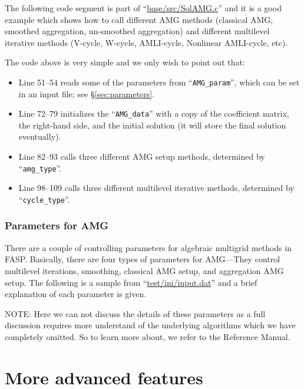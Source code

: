 \documentclass[11pt]{memoir}
\begin{document}
The following code segment is part of ``\url{base/src/SolAMG.c}'' and it is a good example which shows how to call different AMG methods (classical AMG, smoothed aggregation, un-smoothed aggregation) and different multilevel iterative methods (V-cycle, W-cycle, AMLI-cycle, Nonlinear AMLI-cycle, etc).
%

%
The code above is very simple and we only wish to point out that:
%
\begin{itemize}
\item Line 51--54 reads some of the parameters from ``\verb|AMG_param|'', which can be set in an input file; see \S\ref{sec:parameters}.
\item Line 72--79 initializes the ``\verb|AMG_data|'' with a copy of the coefficient matrix, the right-hand side, and the initial solution (it will store the final solution eventually).
\item Line 82--93 calls three different AMG setup methods, determined by ``\verb|amg_type|''.
\item Line 98--109 calls three different multilevel iterative methods, determined by ``\verb|cycle_type|''.
\end{itemize}

\subsection{Parameters for AMG}

There are a couple of controlling parameters for algebraic multigrid methods in FASP. Basically, there are four types of parameters for AMG---They control multilevel iterations, smoothing, classical AMG setup, and aggregation AMG setup. The following is a sample from ``\url{test/ini/input.dat}'' and a brief explanation of each parameter is given.
%

%

\begin{snugshade}\noindent
NOTE: Here we can not discuss the details of these parameters as a full discussion requires more understand of the underlying algorithms which we have completely omitted. So to learn more about, we refer to the Reference Manual.
\end{snugshade}

\chapter{More  advanced features}\label{ch:advanced}
\end{document}
